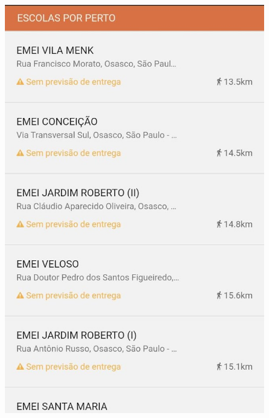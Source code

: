 \documentclass[12pt,a4paper,]{article}
\begin{document}
\vspace{.2cm}

\begin{figure}
     \begin{minipage}[t]{.3\textwidth}
       \centering
       \includegraphics[scale=0.25]{tdp03.jpg}
       \label{}
     \end{minipage}
     \hfill
     \begin{minipage}[t]{.3\textwidth}
       \centering

\end{minipage}
\end{figure}
\end{document}
